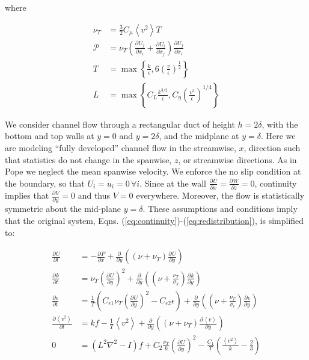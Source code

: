 \documentclass[a4paper,11pt]{article}
\newcommand{\chevron}[1]{\left\langle #1 \right\rangle}
\newcommand{\pderiv}[3][]{%
  \ensuremath{\frac{\partial^{#1} {#2}}{\partial {#3}^{#1}}}}
\newcommand{\noi}{\noindent}
\newcommand{\ep}{\epsilon}
\begin{document}
\noi where 

\begin{align*}
\nu_T &= \frac{3}{2}C_\mu \chevron{v^2} T \\
\mathcal{P} &= \nu_T\left( \pderiv{U_j}{x_i} + \pderiv{U_i}{x_j}\right)\pderiv{U_j}{x_i} \\
T &= \max \left\{ \frac{k}{\ep} , 6 \left( \frac{v}{\ep} \right)^{\frac{1}{2}}
\right\} \\
L &= \max \left\{ C_L \frac{k^{3/2}}{\ep}, C_\eta \left( \frac{v^3}{\ep}
\right)^{1/4} \right\}
\end{align*}

We consider channel flow through a rectangular duct of height $h= 2\delta$, with
the bottom and top walls at $y=0$ and $y=2\delta$, and the midplane at
$y=\delta$.
Here we are modeling ``fully developed'' channel flow in the streamwise, $x$,
direction such that statistics do not change in the spanwise, $z$, or
streamwise directions. As in Pope \cite{pope} we neglect the mean spanwise
velocity. 
We enforce the no slip condition at the boundary, so that
$U_i=u_i=0 \, \forall i$. Since at the wall
$\pderiv{U}{x}=\pderiv{W}{z} = 0$, continuity implies that
$\pderiv{V}{y}=0$ and thus $V=0$ everywhere. Moreover, the flow is statistically
symmetric about the mid-plane $y = \delta$. These assumptions and conditions
imply that the original system, Eqns.
(\ref{eq:continuity})-(\ref{eq:redistribution}), is simplified to: 

\begin{align}
	\label{eq:ssv2f1}
        \pderiv{U}{t} &= -\pderiv{P}{x} +
\pderiv{}{y}\left((\nu+\nu_T)\pderiv{U}{y}\right) \\
        \pderiv{k}{t} &= \nu_T\left(\pderiv{U}{y}\right)^2 + 
\pderiv{}{y}\left((\nu+\frac{\nu_T}{\sigma_k})\pderiv{k}{y}\right) \\
        \pderiv{\ep}{t} &= \frac{1}{T}\left(C_{\ep
1}\nu_T\left(\pderiv{U}{y}\right)^2 - C_{\ep 2}\ep\right) + 
\pderiv{}{y}\left((\nu+\frac{\nu_T}{\sigma_\ep})\pderiv{\ep}{y}\right) \\
        \pderiv{\chevron{v^2}}{t} &= kf - \frac{1}{T}\chevron{v^2} +
\pderiv{}{y}\left((\nu+\nu_T)\pderiv{\chevron{v}}{y}\right) \\
        0 &= \left( L^2\nabla^2 - I\right)f +
C_2\frac{\nu_T}{k}\left(\pderiv{U}{y}\right)^2 -
\frac{C_1}{T}\left(\frac{\chevron{v^2}}{k}-\frac{2}{3}\right)
	\label{eq:ssv2f5}
\end{align}
\end{document}
